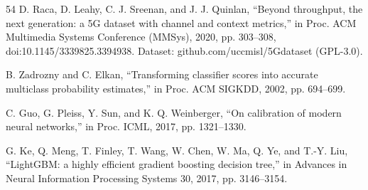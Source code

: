 \begin{thebibliography}{54}
 D. Raca, D. Leahy, C. J. Sreenan, and J. J. Quinlan, ``Beyond throughput, the next generation: a 5G dataset with channel and context metrics,'' in Proc. ACM Multimedia Systems Conference (MMSys), 2020, pp. 303--308, doi:10.1145/3339825.3394938. Dataset: github.com/uccmisl/5Gdataset (GPL-3.0).

 B. Zadrozny and C. Elkan, ``Transforming classifier scores into accurate multiclass probability estimates,'' in Proc. ACM SIGKDD, 2002, pp. 694--699.

 C. Guo, G. Pleiss, Y. Sun, and K. Q. Weinberger, ``On calibration of modern neural networks,'' in Proc. ICML, 2017, pp. 1321--1330.

 G. Ke, Q. Meng, T. Finley, T. Wang, W. Chen, W. Ma, Q. Ye, and T.-Y. Liu, ``LightGBM: a highly efficient gradient boosting decision tree,'' in Advances in Neural Information Processing Systems 30, 2017, pp. 3146--3154.

\end{thebibliography}
